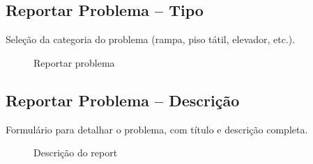 \documentclass[12pt,a4paper]{article}
\begin{document}
\subsection{Reportar Problema – Tipo}
Seleção da categoria do problema (rampa, piso tátil, elevador, etc.).

\begin{figure}[H]
\centering
{}
\caption{Reportar problema}
\end{figure}

\subsection{Reportar Problema – Descrição}
Formulário para detalhar o problema, com título e descrição completa.

\begin{figure}[H]
\centering
{}
\caption{Descrição do report}
\end{figure}
\end{document}
